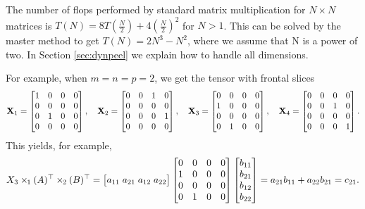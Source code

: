\documentclass[a4paper, leqno, 11pt]{article}
\let\Vec\relax
\DeclareMathOperator{\Vec}{vec}
\theoremstyle{definition}
\theoremstyle{remark}
\theoremstyle{experimental}
\begin{document}
The number of flops performed by standard matrix multiplication for $ N\times N $ matrices is $ T(N)
= 8T(\frac{N}{2}) + 4(\frac{N}{2})^2$ for $ N>1 $. This can be solved by the master method to get
$ T(N)  = 2N^3 - N^2 $, where we assume that N is a power of two. In Section \ref{sec:dynpeel} we
explain how to handle all dimensions.

For example, when $ m=n=p=2 $, we get the tensor with frontal slices
{\small
\[
\Mx{X}_1 = \begin{bmatrix}
  1 & 0 & 0 & 0 \\
  0 & 0 & 0 & 0 \\
  0 & 1 & 0 & 0 \\
  0 & 0 & 0 & 0
\end{bmatrix}, \quad
\Mx{X}_2 = \begin{bmatrix}
  0 & 0 & 1 & 0 \\
  0 & 0 & 0 & 0 \\
  0 & 0 & 0 & 1 \\
  0 & 0 & 0 & 0
\end{bmatrix}, \quad
\Mx{X}_3 = \begin{bmatrix}
  0 & 0 & 0 & 0 \\
  1 & 0 & 0 & 0 \\
  0 & 0 & 0 & 0 \\
  0 & 1 & 0 & 0
\end{bmatrix}, \quad
\Mx{X}_4 = \begin{bmatrix}
  0 & 0 & 0 & 0 \\
  0 & 0 & 1 & 0 \\
  0 & 0 & 0 & 0 \\
  0 & 0 & 0 & 1
\end{bmatrix}.
\]}
This yields, for example,
\begin{equation*}
    X_3 \ttm[1] \Vec(A)^{\top} \ttm[2] \Vec(B)^{\top} =
    \begin{bmatrix}
      a_{11} \; a_{21} \; a_{12} \; a_{22}
    \end{bmatrix}
    \begin{bmatrix}
      0 & 0 & 0 & 0 \\
      1 & 0 & 0 & 0 \\
      0 & 0 & 0 & 0 \\
      0 & 1 & 0 & 0
    \end{bmatrix}
    \begin{bmatrix} b_{11} \\ b_{21}\\b_{12}\\b_{22} \end{bmatrix} 
    = a_{21}b_{11} + a_{22}b_{21} = c_{21}.
\end{equation*}
\end{document}
